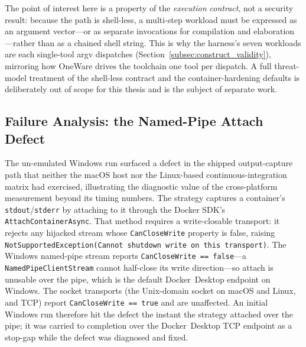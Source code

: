 The point of interest here is a property of the \emph{execution contract}, not a security result: because the path is shell-less, a multi-step workload must be expressed as an argument vector---or as separate invocations for compilation and elaboration---rather than as a chained shell string. This is why the harness's seven workloads are each single-tool argv dispatches (Section~\ref{subsec:construct_validity}), mirroring how OneWare drives the toolchain one tool per dispatch. A full threat-model treatment of the shell-less contract and the container-hardening defaults is deliberately out of scope for this thesis and is the subject of separate work.

\subsection{Failure Analysis: the Named-Pipe Attach Defect}
\label{subsec:npipe_defect}
The un-emulated Windows run surfaced a defect in the shipped output-capture path that neither the macOS host nor the Linux-based continuous-integration matrix had exercised, illustrating the diagnostic value of the cross-platform measurement beyond its timing numbers. The strategy captures a container's \texttt{stdout}/\texttt{stderr} by attaching to it through the Docker SDK's \texttt{AttachContainerAsync}. That method requires a write-closable transport: it rejects any hijacked stream whose \texttt{CanCloseWrite} property is false, raising \texttt{NotSupportedException(\textquotedbl Cannot shutdown write on this transport\textquotedbl)}. The Windows named-pipe stream reports \texttt{CanCloseWrite == false}---a \texttt{NamedPipeClientStream} cannot half-close its write direction---so attach is unusable over the pipe, which is the default Docker~Desktop endpoint on Windows. The socket transports (the Unix-domain socket on macOS and Linux, and TCP) report \texttt{CanCloseWrite == true} and are unaffected. An initial Windows run therefore hit the defect the instant the strategy attached over the pipe; it was carried to completion over the Docker~Desktop TCP endpoint as a stop-gap while the defect was diagnosed and fixed.

